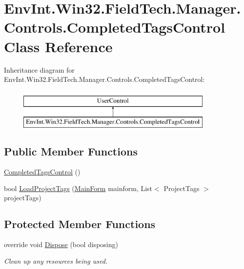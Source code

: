 \hypertarget{class_env_int_1_1_win32_1_1_field_tech_1_1_manager_1_1_controls_1_1_completed_tags_control}{}\section{Env\+Int.\+Win32.\+Field\+Tech.\+Manager.\+Controls.\+Completed\+Tags\+Control Class Reference}
\label{class_env_int_1_1_win32_1_1_field_tech_1_1_manager_1_1_controls_1_1_completed_tags_control}
Inheritance diagram for Env\+Int.\+Win32.\+Field\+Tech.\+Manager.\+Controls.\+Completed\+Tags\+Control\+:\begin{figure}[H]
\begin{center}
\leavevmode
\includegraphics[height=2.000000cm]{class_env_int_1_1_win32_1_1_field_tech_1_1_manager_1_1_controls_1_1_completed_tags_control}
\end{center}
\end{figure}
\subsection*{Public Member Functions}
\begin{DoxyCompactItemize}
\item 
\hyperlink{class_env_int_1_1_win32_1_1_field_tech_1_1_manager_1_1_controls_1_1_completed_tags_control_a5e3721cdc3b18f5a0d62d9baf739322c}{Completed\+Tags\+Control} ()
\item 
bool \hyperlink{class_env_int_1_1_win32_1_1_field_tech_1_1_manager_1_1_controls_1_1_completed_tags_control_a1dd1c19153bda1d4e23c07af3c038694}{Load\+Project\+Tags} (\hyperlink{class_env_int_1_1_win32_1_1_field_tech_1_1_manager_1_1_main_form}{Main\+Form} mainform, List$<$ Project\+Tags $>$ project\+Tags)
\end{DoxyCompactItemize}
\subsection*{Protected Member Functions}
\begin{DoxyCompactItemize}
\item 
override void \hyperlink{class_env_int_1_1_win32_1_1_field_tech_1_1_manager_1_1_controls_1_1_completed_tags_control_a2789a046c5c78f53427ae024bac813b9}{Dispose} (bool disposing)
\begin{DoxyCompactList}\small\item\em Clean up any resources being used. \end{DoxyCompactList}\end{DoxyCompactItemize}


